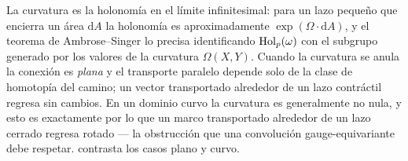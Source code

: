 La curvatura es la holonom\'ia en el l\'imite infinitesimal: para un lazo
peque\~no que encierra un \'area $\mathrm{d}A$ la holonom\'ia es aproximadamente
$\exp(\Omega \cdot \mathrm{d}A)$, y el teorema de Ambrose--Singer lo precisa
identificando $\operatorname{Hol}_p(\omega)$ con el subgrupo generado por los valores de la
curvatura $\Omega(X, Y)$. Cuando la curvatura se anula la conexi\'on es
\emph{plana} y el transporte paralelo depende solo de la clase de homotop\'ia del
camino; un vector transportado alrededor de un lazo contr\'actil regresa sin
cambios. En un dominio curvo la curvatura es generalmente no nula, y esto es
exactamente por lo que un marco transportado alrededor de un lazo cerrado regresa
rotado --- la obstrucci\'on que una convoluci\'on gauge-equivariante debe
respetar.  contrasta los casos plano y curvo.

